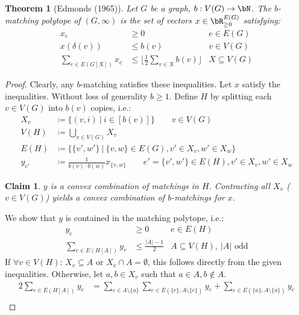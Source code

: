 \documentclass[11pt, a4paper]{article}
\newcommand{\floor}[1]{\lfloor #1 \rfloor}
\newcommand{\abs}[1]{\left\lvert#1\right\rvert}
\newcommand{\set}[1]{\{#1\}}
\newtheorem{theorem}{Theorem}[section]
\newtheorem*{claim}{Claim}
\theoremstyle{remark}
\theoremstyle{definition}
\begin{document}
\begin{theorem}[Edmonds (1965)]
	Let $G$ be a graph, $b: V(G)\to\bN$. The $b$-matching polytope of $(G,\infty)$
	is the set of vectors $x\in \bR^{E(G)}_{\geq0}$ satisfying:
	\begin{align*}
		x_e                    & \geq0                                     & e\in E(G)       \\
		x(\delta(v))           & \leq b(v)                                 & v\in V(G)       \\
		\sum_{e\in E(G[X])}x_e & \leq \floor{\frac{1}{2}\sum_{v\in X}b(v)} & X\subseteq V(G)
	\end{align*}
\end{theorem}
\begin{proof}
	Clearly, any $b$-matching satisfies these inequalities. Let $x$ satisfy
	the inequalities. Without loss of generality $b\geq1$. Define $H$ by
	splitting each $v\in V(G)$ into $b(v)$ copies, i.e.:
	\begin{align*}
		X_v    & \coloneqq \set{(v,i)\ |\ i\in [b(v)]} \qquad v\in V(G)                                             \\
		V(H)   & \coloneqq \bigcup_{v\in V(G)}X_v                                                                   \\
		E(H)   & \coloneqq \set{\set{v',w'}\ |\ \set{v,w}\in E(G),v'\in X_v,w'\in X_w}                              \\
		y_{e'} & \coloneqq \frac{1}{b(v)\cdot b(w)} x_{\set{v,w}} \qquad e'=\set{v',w'}\in E(H),v'\in X_v,w'\in X_w
	\end{align*}
	\begin{claim}
		$y$ is a convex combination of matchings in $H$. Contracting all $X_v$
		($v\in V(G)$) yields a convex combination of $b$-matchings for $x$.
	\end{claim}
	We show that $y$ is contained in the matching polytope, i.e.:
	\begin{align*}
		y_e                    & \geq0                    & e\in E(H)                            \\
		\sum_{e\in E(H[A])}y_e & \leq \frac{\abs{A}-1}{2} & A\subseteq V(H),\ \abs{A}\text{ odd}
	\end{align*}
	If $\forall v\in V(H)$: $X_v\subseteq A$ or $X_v\cap A=\emptyset$, this
	follows directly from the given inequalities. Otherwise, let $a,b\in X_v$
	such that $a\in A,b\notin A$.
	\begin{align*}
		2\sum_{e\in E(H[A])}y_e & =\sum_{c\in A\setminus\set{a}}\sum_{e\in E(\set{c},A\setminus\set{c})}y_e + \sum_{e\in E(\set{a},A\setminus\set{a})}y_e                                              \\

\end{align*}
\end{proof}
\end{document}
